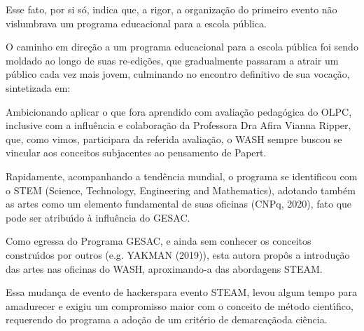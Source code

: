 \documentclass[
12pt,		%
openright,	%
twoside,  %
a4paper,			%
chapter=TITLE,		%
english,			%
french,				%
spanish,			%
brazil				%
]{USPSC-classe/USPSC}
\begin{document}
Esse fato, por si s\'o, indica que, a rigor, a organiza\c{c}\~ao do primeiro evento n\~ao vislumbrava um programa educacional para a escola p\'ublica.








O caminho em dire\c{c}\~ao a um programa educacional para a escola p\'ublica foi sendo moldado ao longo de suas re-edi\c{c}\~oes, que gradualmente passaram a atrair um p\'ublico cada vez mais jovem, culminando no encontro definitivo de sua voca\c{c}\~ao, sintetizada em:









\noindent\begin{center}\mbox{\centering{}}\end{center}


Ambicionando aplicar o que fora aprendido com avalia\c{c}\~ao pedag\'ogica do OLPC, inclusive com a influ\^encia e colabora\c{c}\~ao da Professora Dra Afira Vianna Ripper, que, como vimos, participara da referida avalia\c{c}\~ao, o WASH sempre buscou se vincular aos conceitos subjacentes ao pensamento de Papert.








Rapidamente, acompanhando a tend\^encia mundial, o programa se identificou com o STEM (Science, Technology, Engineering and Mathematics), adotando tamb\'em as artes como um elemento fundamental de suas oficinas  (CNPq, 2020), fato que pode ser atribu\'{\i}do \`a influ\^encia do GESAC.








Como egressa do Programa GESAC, e ainda sem conhecer os conceitos constru\'{\i}dos por outros (e.g.  YAKMAN (2019)), esta autora prop\^os a introdu\c{c}\~ao das artes nas oficinas do WASH, aproximando-a das abordagens STEAM.








Essa mudan\c{c}a de \textquotedbl evento de hackers\textquotedbl  para \textquotedbl evento STEAM\textquotedbl , levou algum tempo para amadurecer e exigiu um compromisso maior com o conceito de m\'etodo cient\'{\i}fico, requerendo do programa a ado\c{c}\~ao de um \textquotedbl crit\'erio de demarca\c{c}\~ao\textquotedbl  da ci\^encia.
\end{document}
